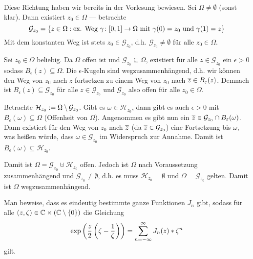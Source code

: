 \begin{exercisePage}
	\begin{equivalence}
		\rueckrichtung Diese Richtung haben wir bereits in der Vorlesung bewiesen.
		\hinrichtung Sei $\Omega \neq \emptyset$ (sonst klar). Dann existiert $z_0 \in \Omega$ --- betrachte 
		\begin{equation*}
			\mathcal{G}_{z_0} = \left\{ z \in \Omega : \text{ex. Weg } \gamma \colon [0,1] \to \Omega \text{ mit } \gamma(0) = z_0 \text{ und } \gamma(1) = z \right\}
		\end{equation*}
		Mit dem konstanten Weg ist stets $z_0 \in \mathcal{G}_{z_0}$, d.h. $\mathcal{G}_{z_0} \neq \emptyset$ für alle $z_0 \in \Omega$.
		
		Sei $z_0 \in \Omega$ beliebig. Da $\Omega$ offen ist und $\mathcal{G}_{z_0} \subseteq \Omega$, existiert für alle $z \in \mathcal{G}_{z_0}$ ein $\epsilon > 0$ sodass $B_\epsilon(z) \subseteq \Omega$. Die $\epsilon$-Kugeln sind wegzusammenhängend, d.h. wir können den Weg von $z_0$ nach $z$ fortsetzen zu einem Weg von $z_0$ nach $\overline{z} \in B_\varepsilon(z)$. Demnach ist $B_\epsilon(z) \subseteq \mathcal{G}_{z_0}$ für alle $z \in \mathcal{G}_{z_0}$ und $\mathcal{G}_{z_0}$ also offen für alle $z_0 \in \Omega$. 
		
		Betrachte $\mathcal{H}_{z_0} \mathrel{:=} \Omega \setminus \mathcal{G}_{z_0}$. Gibt es $\omega \in \mathcal{H}_{z_0}$, dann gibt es auch $\epsilon > 0$ mit $B_\epsilon(\omega) \subseteq \Omega$ (Offenheit von $\Omega$). Angenommen es gibt nun ein $\overline{z} \in \mathcal{G}_{z_0} \cap B_\varepsilon(\omega)$. Dann existiert für den Weg von $z_0$ nach $\overline{z}$ (da $\overline{z} \in \mathcal{G}_{z_0}$) eine Fortsetzung bis $\omega$, was heißen würde, dass $\omega \in \mathcal{G}_{z_0}$ im Widerspruch zur Annahme. Damit ist $B_\epsilon(\omega) \subseteq \mathcal{H}_{z_0}$. 
		
		Damit ist $\Omega = \mathcal{G}_{z_0} \cupdot \mathcal{H}_{z_0}$ offen. Jedoch ist $\Omega$ nach Voraussetzung zusammenhängend und $\mathcal{G}_{z_0} \neq \emptyset$, d.h. es muss $\mathcal{H}_{z_0} = \emptyset$ und $\Omega = \mathcal{G}_{z_0}$ gelten. Damit ist $\Omega$ wegzusammenhängend.
	\end{equivalence}

	\begin{task}
		Man beweise, dass es eindeutig bestimmte ganze Funktionen $J_n$ gibt, sodass für alle $(z,\zeta) \in \mathbb{C} \times (\mathbb{C} \setminus \left\{ 0 \right\})$ die Gleichung
		\begin{equation*}
			\exp\left( \frac{z}{2} \left( \zeta - \frac{1}{\zeta} \right) \right) = \sum_{n = -\infty}^\infty J_n(z) * \zeta^n
		\end{equation*}
		gilt.
	\end{task}
\end{exercisePage}